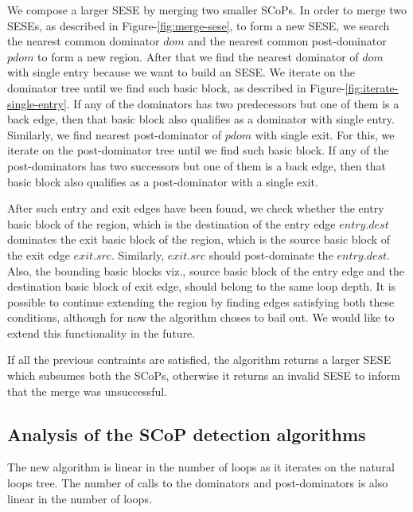 \documentclass{sigplanconf}
\begin{document}

We compose a larger SESE by merging two smaller SCoPs. In order to merge two
SESEs, as described in Figure-\ref{fig:merge-sese}, to form a new SESE, we
search the nearest common dominator $dom$ and the nearest common post-dominator
$pdom$ to form a new region.  After that we find the nearest dominator of $dom$
with single entry because we want to build an SESE.  We iterate on the dominator
tree until we find such basic block, as described in
Figure-\ref{fig:iterate-single-entry}.  If any of the dominators has two
predecessors but one of them is a back edge, then that basic block also
qualifies as a dominator with single entry.  Similarly, we find nearest
post-dominator of $pdom$ with single exit.  For this, we iterate on the
post-dominator tree until we find such basic block.  If any of the
post-dominators has two successors but one of them is a back edge, then that
basic block also qualifies as a post-dominator with a single exit.

After such entry and exit edges have been found, we check whether the entry
basic block of the region, which is the destination of the entry edge
$entry.dest$ dominates the exit basic block of the region, which is the source
basic block of the exit edge $exit.src$.  Similarly, $exit.src$ should
post-dominate the $entry.dest$.  Also, the bounding basic blocks viz., source
basic block of the entry edge and the destination basic block of exit edge,
should belong to the same loop depth.  It is possible to continue extending the
region by finding edges satisfying both these conditions, although for now the
algorithm choses to bail out.  We would like to extend this functionality in the
future.

If all the previous contraints are satisfied, the algorithm returns a larger
SESE which subsumes both the SCoPs, otherwise it returns an invalid SESE to
inform that the merge was unsuccessful.

\subsection{Analysis of the SCoP detection algorithms}
The new algorithm is linear in the number of loops as it iterates on the
natural loops tree.  The number of calls to the dominators and post-dominators
is also linear in the number of loops.
\end{document}

